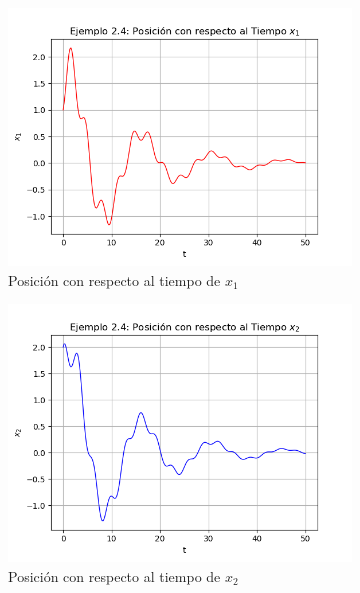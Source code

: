 \documentclass[a4paper]{article}
\begin{document}
\begin{center}
\begin{figure}[ht!]
\begin{subfigure}{0.6\textwidth}
  \includegraphics[width=\linewidth]{ejemplo_2_4_2.png}
  \caption{Posición con respecto al tiempo de $x_1$}
\end{subfigure}
\begin{subfigure}{0.6\textwidth}
  \centering
  \includegraphics[width=\linewidth]{ejemplo_2_4_3.png}
  \caption{Posición con respecto al tiempo de $x_2$}
\end{subfigure}
\begin{subfigure}{0.6\textwidth}
  \centering

\end{subfigure}
\end{figure}
\end{center}
\end{document}
